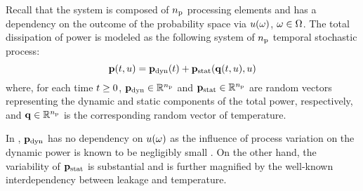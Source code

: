Recall that the system is composed of ${n_\text{p}}$ processing elements and has a dependency on the outcome of the probability space via $u(\omega)$, $\omega \in \Omega$.
The total dissipation of power is modeled as the following system of ${n_\text{p}}$ temporal stochastic process:
\begin{equation} \elab{power-model}
  \vP(\t, \u) = \vP_\dynamic(\t) + \vP_\static(\vQ(\t, \u), \u)
\end{equation}
where, for each time $t \geq 0$, $\mathbf{p}_{\text{dyn}} \in \mathbb{R}^{n_\text{p}}$ and $\mathbf{p}_{\text{stat}} \in \mathbb{R}^{n_\text{p}}$ are random vectors representing the dynamic and static components of the total power, respectively, and $\mathbf{q} \in \mathbb{R}^{n_\text{p}}$ is the corresponding random vector of temperature.
\begin{remark}
In , \textnormal{$\mathbf{p}_{\text{dyn}}$} has no dependency on $u(\omega)$ as the influence of process variation on the dynamic power is known to be negligibly small \cite{srivastava2010}.
On the other hand, the variability of \textnormal{$\mathbf{p}_{\text{stat}}$} is substantial and is further magnified by the well-known interdependency between leakage and temperature.
\end{remark}
